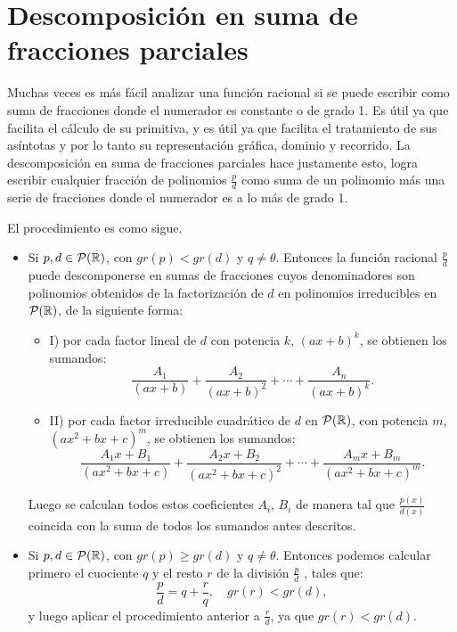 \newpage

\section{Descomposici\'on en suma de fracciones parciales}

Muchas veces es más fácil analizar una función racional si se puede escribir como suma de fracciones donde el numerador es constante o de grado 1. 
Es útil ya que facilita el cálculo de su primitiva, y es útil ya que facilita el tratamiento de sus asíntotas y por lo tanto su representación gráfica, dominio y recorrido.
La descomposici\'on en suma de fracciones parciales hace justamente esto, logra escribir cualquier fracción de polinomios $\displaystyle\frac{p}{d}$ como suma de un polinomio más una serie de fracciones donde el numerador es a lo más de grado 1.

El procedimiento es como sigue.

\begin{itemize}
\item Si $p, d \in \mathcal{P}(\mathbb{R})$,  con $gr(p)<gr(d)$ y $q\ne \theta$.  Entonces la funci\'on racional $\displaystyle\frac{p}{d}$ puede descomponerse en sumas de fracciones cuyos denominadores son polinomios obtenidos de la factorizaci\'on de $d$ en polinomios irreducibles en $ \mathcal{P}(\mathbb{R})$, de la siguiente forma:

\vspace{.5cm}

\begin{itemize}

\item I)  por cada factor lineal de $d$ con potencia $k$, $(ax+b)^k$,  se obtienen los sumandos:
$$\frac{A_1}{(ax+b)}+ \frac{A_2}{(ax+b)^2}+\cdots +\frac{A_n}{(ax+b)^k}.$$
\end{itemize}


\begin{itemize}

\item II)  por cada factor  irreducible cuadr\'atico de $d$ en  $\mathcal{P}(\mathbb{R})$, con potencia $m$,  $(ax^2+bx+c)^m$, se obtienen los sumandos:
$$\frac{A_1x+B_1}{(ax^2+bx+c)}+ \frac{A_2x+B_2}{(ax^2+bx+c)^2}+ \cdots +\frac{A_mx+B_m}{(ax^2+bx+c)^m}.$$

\end{itemize}

Luego se calculan todos estos coeficientes $A_i$, $B_i$ de manera tal que $\displaystyle\frac{p(x)}{d(x)}$ coincida con la suma de todos los sumandos antes descritos.

\item Si $p, d \in \mathcal{P}(\mathbb{R})$,  con $gr(p)\ge gr(d)$ y $q\ne \theta$.
Entonces podemos calcular primero el cuociente $q$ y el resto $r$ de la divisi\'on $\displaystyle\frac{p}{d}$ , tales que:
$$\frac{p}{d}=q+\frac{r}{q}, \quad  gr(r)<gr(d),$$
y luego aplicar el procedimiento anterior a $\displaystyle\frac{r}{d}$, ya que $gr(r)<gr(d)$.
\end{itemize}

